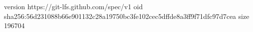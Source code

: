 version https://git-lfs.github.com/spec/v1
oid sha256:56d231088b66e901132c28a19750bc3fe102cec5dffde8a3ff9f71dfc97d7cea
size 196704
